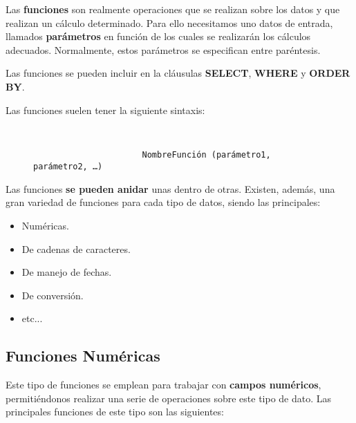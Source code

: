 Las \textbf{funciones} son realmente operaciones que se realizan sobre los datos y que realizan un cálculo determinado. Para ello necesitamos uno datos de entrada, llamados \textbf{parámetros} en función de los cuales se realizarán los cálculos adecuados. Normalmente, estos parámetros se especifican entre paréntesis.

Las funciones se pueden incluir en la cláusulas \textbf{SELECT}, \textbf{WHERE} y \textbf{ORDER BY}.

Las funciones suelen tener la siguiente sintaxis:

\begin{figure}[h]
    \begin{tcolorbox}[sharp corners, colback=yellow!30, colframe=white!20]
        \scriptsize
        \begin{verbatim}


                      NombreFunción (parámetro1, parámetro2, …)
        \end{verbatim}
    \end{tcolorbox}
\end{figure}

Las funciones \textbf{se pueden anidar} unas dentro de otras. Existen, además, una gran variedad de funciones para cada tipo de datos, siendo las principales:

\begin{itemize}
    \item Numéricas.
    \item De cadenas de caracteres.
    \item De manejo de fechas.
    \item De conversión.
    \item etc...
\end{itemize}

\subsection{Funciones Numéricas}
Este tipo de funciones se emplean para trabajar con \textbf{campos numéricos}, permitiéndonos realizar una serie de operaciones sobre este tipo de dato. Las principales funciones de este tipo son las siguientes:

